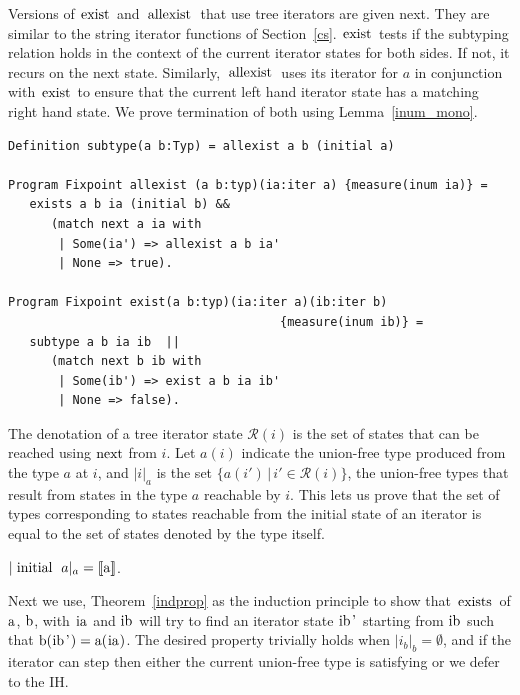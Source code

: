 \documentclass[a4paper,english]{lipics-v2019}
\newcommand{\denotes}[1]{\llbracket #1 \rrbracket}
\renewcommand{\c}[1]{\ensuremath{\text{\lstinline{#1}}}\xspace}
\begin{document}
\noindent
Versions of \c{exist} and \c{allexist} that use tree iterators are given
next. They are similar to the string iterator functions of Section~\ref{cs}.
\c{exist} tests if the subtyping relation holds in the context of the
current iterator states for both sides. If not, it recurs on the next
state. Similarly, \c{allexist} uses its iterator for $a$ in conjunction with
\c{exist} to ensure that the current left hand iterator state has a matching
right hand state. We prove termination of both using Lemma~\ref{inum_mono}.

\begin{lstlisting}
Definition subtype(a b:Typ) = allexist a b (initial a)

Program Fixpoint allexist (a b:typ)(ia:iter a) {measure(inum ia)} =
   exists a b ia (initial b) && 
      (match next a ia with 
       | Some(ia') => allexist a b ia' 
       | None => true).

Program Fixpoint exist(a b:typ)(ia:iter a)(ib:iter b)
                                      {measure(inum ib)} =
   subtype a b ia ib  || 
      (match next b ib with 
       | Some(ib') => exist a b ia ib' 
       | None => false).
\end{lstlisting}

\newcommand{\irdn}[1]{\ensuremath{\mathcal{R}({#1})}}
\newcommand{\irch}[2]{\ensuremath{|#1|_{#2}}}

\noindent
The denotation of a tree iterator state $\irdn{i}$ is the set of states that
can be reached using \c{next} from $i$. Let $a(i)$ indicate the union-free
type produced from the type $a$ at $i$, and \irch{i}{a} is the set
$\{a(i')\,|\,i'\in\irdn{i}\}$, the union-free types that result from states
in the type $a$ reachable by $i$.  This lets us prove that the set of types
corresponding to states reachable from the initial state of an iterator is
equal to the set of states denoted by the type itself.

\begin{lemma}\label{triter_eq}
$\irch{\c{initial}~a}{a} = \denotes{\c a}$.
\end{lemma}

\noindent
Next we use, Theorem~\ref{indprop} as the induction principle to show that
\c{exists} of \c{a}, \c{b}, with \c{ia} and \c{ib} will try to find an iterator
state \c{ib'} starting from \c{ib} such that $\c b(\c{ib'}) = \c a(\c{ia})$. The
desired property trivially holds when $\irch{i_b}{b} = \emptyset$, and if
the iterator can step then either the current union-free type is satisfying
or we defer to the IH.
\end{document}

